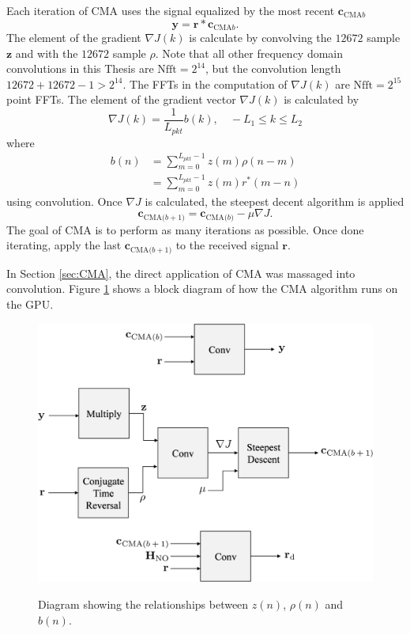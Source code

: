 Each iteration of CMA uses the signal equalized by the most recent $\mathbf{c}_{\text{CMA}b}$
\begin{equation}
\mathbf{y} = \mathbf{r}*\mathbf{c}_{\text{CMA}b}.
\end{equation}
The element of the gradient $\nabla J(k)$ is calculate by convolving the $12672$ sample $\mathbf{z}$ and with the $12672$ sample $\rho$. 
Note that all other frequency domain convolutions in this Thesis are $\text{Nfft} = 2^{14}$, but the convolution length $12672+12672-1>2^{14}$. The FFTs in the computation of $\nabla J(k)$ are $\text{Nfft} = 2^{15}$ point FFTs.
The element  of the gradient vector $\nabla J(k)$ is calculated by
\begin{equation}
\nabla J(k) = \frac{1}{L_{pkt}} b(k), \quad -L_1 \leq k \leq L_2
\end{equation}
where
\begin{align}
b(n) &= \sum^{L_{pkt}-1}_{m=0} z(m) \rho(n-m) \nonumber \\
	 &= \sum^{L_{pkt}-1}_{m=0} z(m) r^\ast(m-n)
\end{align}
using convolution.
Once $\nabla J$ is calculated, the steepest decent algorithm is applied
\begin{equation}
\mathbf{c}_\text{CMA($b+1$)} = \mathbf{c}_\text{CMA($b$)}-\mu \nabla J.
\end{equation}
The goal of CMA is to perform as many iterations as possible.
Once done iterating, apply the last $\mathbf{c}_\text{CMA($b+1$)}$ to the received signal $\mathbf{r}$.

In Section \ref{sec:CMA}, the direct application of CMA was massaged into convolution.
Figure \ref{fig:blockCMA} shows a block diagram of how the CMA algorithm runs on the GPU.
\begin{figure}
	\centering\includegraphics[width=8.34in/100*55]{figures/eq_GPUimplementation/blockCMA.pdf}
	\label{fig:blockCMA}
	\caption{Diagram showing the relationships between $z(n)$, $\rho(n)$ and $b(n)$.}
\end{figure}

